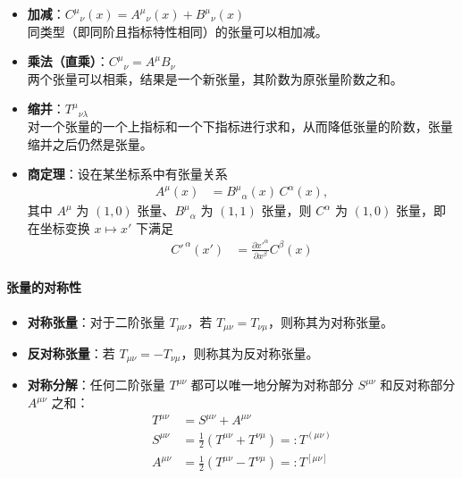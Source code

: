       \begin{itemize}
        \item \textbf{加减}：$C^{\mu}{}_{\nu}(x) = A^{\mu}{}_{\nu}(x) + B^{\mu}{}_{\nu}(x)$ \\
              同类型（即同阶且指标特性相同）的张量可以相加减。
        \item \textbf{乘法（直乘）}：$C^\mu{}_{\nu} = A^\mu B_\nu$ \\ 两个张量可以相乘，结果是一个新张量，其阶数为原张量阶数之和。
        \item \textbf{缩并}：$T^{\mu}{}_{\nu \lambda}$\\对一个张量的一个上指标和一个下指标进行求和，从而降低张量的阶数，张量缩并之后仍然是张量。
        \item \textbf{商定理}：设在某坐标系中有张量关系
          \begin{align}
          A^\mu(x) &= B^\mu{}_{\alpha}(x)\,C^{\alpha}(x),
          \end{align}
        其中 $A^\mu$ 为 $(1,0)$ 张量、$B^\mu{}_{\alpha}$ 为 $(1,1)$ 张量，则
        $C^{\alpha}$ 为 $(1,0)$ 张量，即在坐标变换 $x\mapsto x'$ 下满足
          \begin{align}
          C'^{\,\alpha}(x') &= \frac{\partial x'^{\alpha}}{\partial x^\beta}C^\beta(x)
          \end{align}
      \end{itemize}

    \paragraph{张量的对称性}
      \begin{itemize}
        \item \textbf{对称张量}：对于二阶张量 \( T_{\mu \nu} \)，若 \( T_{\mu \nu} = T_{\nu \mu} \)，则称其为对称张量。
        \item \textbf{反对称张量}：若 \( T_{\mu \nu} = -T_{\nu \mu} \)，则称其为反对称张量。
        \item \textbf{对称分解}：任何二阶张量 \( T^{\mu \nu} \) 都可以唯一地分解为对称部分 \( S^{\mu \nu} \) 和反对称部分 \( A^{\mu \nu} \) 之和：
        \begin{align}
          T^{\mu \nu} &= S^{\mu \nu} + A^{\mu \nu} \\
          S^{\mu \nu} &= \frac{1}{2}(T^{\mu \nu} + T^{\nu \mu}) =: T^{(\mu \nu)} \\
          A^{\mu \nu} &= \frac{1}{2}(T^{\mu \nu} - T^{\nu \mu}) =: T^{[\mu \nu]}
        \end{align}
      \end{itemize}

